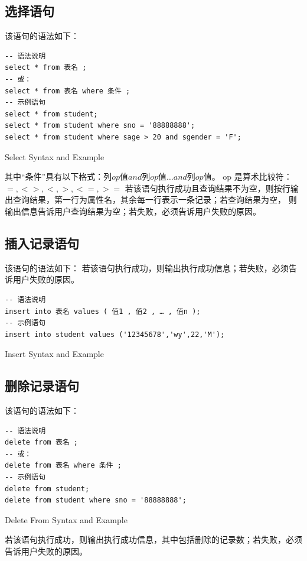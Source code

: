 \documentclass[UTF8]{ctexrep} %
\newenvironment{longlisting}{\captionsetup{type=listing}}{}
\begin{document}
\subsection{选择语句}
该语句的语法如下：
\begin{longlisting}
    \begin{verbatim}
-- 语法说明
select * from 表名 ;
-- 或：
select * from 表名 where 条件 ;
-- 示例语句
select * from student;
select * from student where sno = '88888888';
select * from student where sage > 20 and sgender = 'F';
    \end{verbatim}
    \caption{Select Syntax and Example}
    \label{lst:select_requirements}
\end{longlisting}
其中“条件”具有以下格式：$列 op 值 and 列 op 值 … and 列 op 值$。
op 是算术比较符：$=, <>, <, >, <=, >=$
若该语句执行成功且查询结果不为空，则按行输出查询结果，第一行为属性名，其余每一行表示一条记录；若查询结果为空，
则输出信息告诉用户查询结果为空；若失败，必须告诉用户失败的原因。

\subsection{插入记录语句}
该语句的语法如下：
若该语句执行成功，则输出执行成功信息；若失败，必须告诉用户失败的原因。
\begin{longlisting}
    \begin{verbatim}
-- 语法说明
insert into 表名 values ( 值1 , 值2 , … , 值n );
-- 示例语句
insert into student values ('12345678','wy',22,'M');
    \end{verbatim}
    \caption{Insert Syntax and Example}
    \label{lst:insert_requirements}
\end{longlisting}

\subsection{删除记录语句}
该语句的语法如下：
\begin{longlisting}
    \begin{verbatim}
-- 语法说明
delete from 表名 ;
-- 或：
delete from 表名 where 条件 ;
-- 示例语句
delete from student;
delete from student where sno = '88888888';
    \end{verbatim}
    \caption{Delete From Syntax and Example}
    \label{lst:delete_from_requirements}
\end{longlisting}
若该语句执行成功，则输出执行成功信息，其中包括删除的记录数；若失败，必须告诉用户失败的原因。
\end{document}
